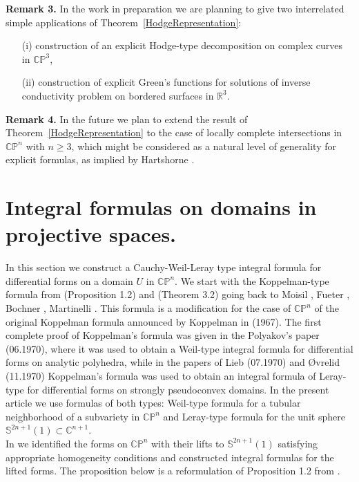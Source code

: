 \documentclass[11pt,reqno]{amsart}
\numberwithin{equation}{section}
\begin{document}
{\bf Remark 3.} In the work in preparation we are planning to give two interrelated simple applications of Theorem~\ref{HodgeRepresentation}:
\begin{itemize}
\item[(i)]
construction of an explicit Hodge-type decomposition on complex curves in ${{\mathbb C}}{{\mathbb P}}^3$,\vspace{0.1in}
\item[(ii)]
construction of explicit Green's functions for solutions of inverse conductivity problem on bordered
surfaces in ${{\mathbb R}}^3$.
\end{itemize}

{\bf Remark 4.} In the future we plan to extend the result of
Theorem~\ref{HodgeRepresentation} to the case of locally complete intersections in ${{\mathbb C}}{{\mathbb P}}^n$
with $n\geq 3$, which might be considered as a natural level of generality for explicit formulas, as
implied by Hartshorne \cite{Ha}.

\section{Integral formulas on domains in projective spaces.}
\label{Formulas}

\indent
In this section we construct a Cauchy-Weil-Leray type integral formula for differential
forms on a domain $U$ in ${{\mathbb C}}{{\mathbb P}}^n$. We start with the Koppelman-type formula
from \cite{HP1} (Proposition 1.2) and \cite{He} (Theorem 3.2) going back to Moisil \cite{Mo},
Fueter \cite{F}, Bochner \cite{Bo}, Martinelli \cite{Ma}.
This formula is a modification for the case of ${{\mathbb C}}{{\mathbb P}}^n$ of the original Koppelman formula
announced by Koppelman in \cite{Kp} (1967). The first
complete proof of Koppelman's formula was given in the Polyakov's paper \cite{Po} (06.1970),
where it was used to obtain a Weil-type integral formula \cite{Wi} for differential forms
on analytic polyhedra, while in the papers of Lieb \cite{Li} (07.1970)
and \O vrelid \cite{O} (11.1970)
Koppelman's formula was used to obtain an integral formula of Leray-type \cite{Le}
for differential forms on strongly pseudoconvex domains. In the present article
we use formulas of both types: Weil-type formula for a tubular neighborhood
of a subvariety in ${{\mathbb C}}{{\mathbb P}}^n$ and Leray-type formula for the unit sphere
${{\mathbb S}}^{2n+1}(1)\subset {{\mathbb C}}^{n+1}$.\\
\indent
In \cite{HP1} we identified the forms on ${{\mathbb C}}{{\mathbb P}}^n$ with their lifts to ${{\mathbb S}}^{2n+1}(1)$ satisfying
appropriate homogeneity conditions and constructed integral formulas for the lifted forms.
The proposition below is a reformulation of Proposition 1.2 from \cite{HP1}.
\end{document}
